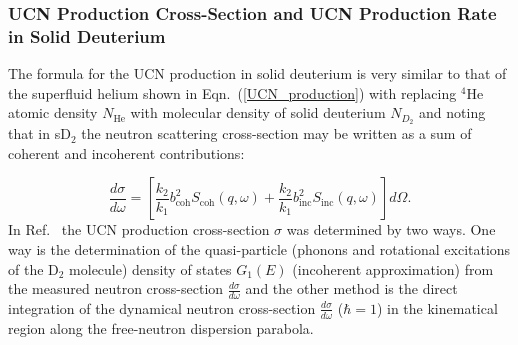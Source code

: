 




\subsubsection{UCN Production Cross-Section and UCN Production Rate in Solid Deuterium~\cite{ucnbook,Frei2010,Frei2009}}

The formula for the UCN production in solid deuterium is very similar
to that of the superfluid helium shown in Eqn.~(\ref{UCN_production})
with replacing $^4$He atomic density $N_{\text{He}}$ with molecular density
of solid deuterium $N_{D_2}$ and noting that in sD$_2$ the neutron
scattering cross-section may be written as a sum of coherent and
incoherent contributions:

\begin{equation}
\label{eqn:dsigma}
\frac{d\sigma}{d\omega}=\left[ \frac{k_2}{k_1} 
b_{\text{coh}}^2 S_{\text{coh}} (q,\omega) + \frac{k_2}{k_1} b_{\text{inc}}^2 S_{\text{inc}}(q,\omega) \right]
 d\Omega.
\end{equation}
In Ref.~\cite{Frei2010} the UCN production cross-section $\sigma$
was determined by two ways. One way is the determination of the
quasi-particle (phonons and rotational excitations of the D$_2$
molecule) density of states $G_1(E)$ (incoherent approximation) from
the measured neutron cross-section $\frac{d\sigma}{d\omega}$ and the
other method is the direct integration of the dynamical neutron
cross-section $\frac{d\sigma}{d\omega}$ ($\hbar=1$) in the kinematical
region along the free-neutron dispersion parabola.

